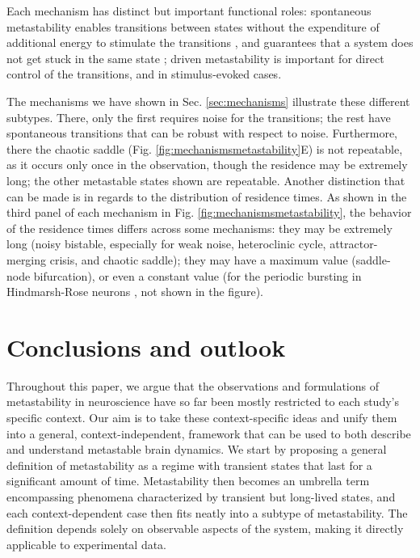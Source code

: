 \documentclass[reprint,superscriptaddress,showpacs,amsmath,amssymb,aps,floatfix,nolongbibliography]{revtex4-2}
\theoremstyle{definition}
\begin{document}
Each mechanism has distinct but important functional roles: spontaneous metastability enables transitions between states without the expenditure of additional energy to stimulate the transitions \cite{tognoli2014metastable}, and guarantees that a system does not get stuck in the same state \cite{ito2008dynamics}; driven metastability is important for direct control of the transitions, and in stimulus-evoked cases.

The mechanisms we have shown in Sec. \ref{sec:mechanisms} illustrate these different subtypes. There, only the first requires noise for the transitions; the rest have spontaneous transitions that can be robust with respect to noise. Furthermore, there the chaotic saddle (Fig. \ref{fig:mechanismsmetastability}E) is not repeatable, as it occurs only once in the observation, though the residence may be extremely long; the other metastable states shown are repeatable. Another distinction that can be made is in regards to the distribution of residence times. As shown in the third panel of each mechanism in Fig. \ref{fig:mechanismsmetastability}, the behavior of the residence times differs across some mechanisms: they may be extremely long (noisy bistable, especially for weak noise, heteroclinic cycle, attractor-merging crisis, and chaotic saddle); they may have a maximum value (saddle-node bifurcation), or even a constant value (for the periodic bursting in Hindmarsh-Rose neurons \cite{hindmarshmodel1984}, not shown in the figure).

\section{Conclusions and outlook}

Throughout this paper, we argue that the observations and formulations of metastability in neuroscience have so far been mostly restricted to each study's specific context. Our aim is to take these context-specific ideas and unify them into a general, context-independent, framework that can be used to both describe and understand metastable brain dynamics. We start by proposing a general definition of metastability as a regime with transient states that last for a significant amount of time. Metastability then becomes an umbrella term encompassing phenomena characterized by transient but long-lived states, and each context-dependent case then fits neatly into a subtype of metastability.  The definition depends solely on observable aspects of the system, making it directly applicable to experimental data. 
\end{document}
